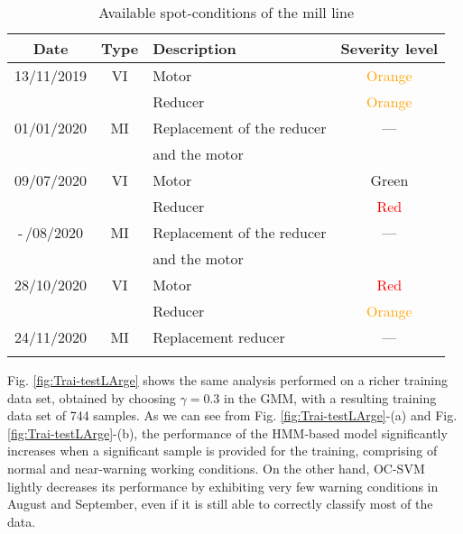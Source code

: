 \begin{table}[h]
	\centering
    \caption{Available spot-conditions of the mill line}
	\begin{tabular}{c c l c}
    \toprule
	Date  & Type & Description & Severity level\\
	\midrule
	\cellcolor[HTML]{EFEFEF}13/11/2019  & \cellcolor[HTML]{EFEFEF}VI &  Motor\cellcolor[HTML]{EFEFEF} & \cellcolor[HTML]{EFEFEF} \textcolor{orange}{Orange}  \\
	\cellcolor[HTML]{EFEFEF}& \cellcolor[HTML]{EFEFEF}& \cellcolor[HTML]{EFEFEF}Reducer & \cellcolor[HTML]{EFEFEF} \textcolor{orange}{Orange}  \\
	01/01/2020  & MI & Replacement of the reducer& ---\\ 
	& & and the motor &\\
	\cellcolor[HTML]{EFEFEF}09/07/2020  &\cellcolor[HTML]{EFEFEF} VI &\cellcolor[HTML]{EFEFEF} Motor &\cellcolor[HTML]{EFEFEF} \textcolor{green!60!black}{Green} \\
	\cellcolor[HTML]{EFEFEF}&\cellcolor[HTML]{EFEFEF} &\cellcolor[HTML]{EFEFEF} Reducer &\cellcolor[HTML]{EFEFEF} \textcolor{red}{Red} \\
	-\,/08/2020 & MI & Replacement of the reducer& ---\\ 
	& & and the motor &\\
	\cellcolor[HTML]{EFEFEF}28/10/2020  &\cellcolor[HTML]{EFEFEF} VI &\cellcolor[HTML]{EFEFEF} Motor &\cellcolor[HTML]{EFEFEF} \textcolor{red}{Red} \\
	\cellcolor[HTML]{EFEFEF}&\cellcolor[HTML]{EFEFEF} &\cellcolor[HTML]{EFEFEF} Reducer &\cellcolor[HTML]{EFEFEF} \textcolor{orange}{Orange} \\
	24/11/2020 & MI & Replacement reducer & ---\\ 
	& &  &\\
	\toprule
\end{tabular}
\label{tab: maintenance}
\end{table}	
Fig. \ref{fig:Trai-testLArge} shows the same analysis performed on a richer training data set, obtained by choosing $\gamma=0.3$ in the GMM, with a resulting training data set of 744 samples. As we can see from Fig. \ref{fig:Trai-testLArge}-(a) and Fig. \ref{fig:Trai-testLArge}-(b), the performance of the HMM-based model significantly increases when a significant sample is provided for the training, comprising of normal and near-warning working conditions. On the other hand, OC-SVM lightly decreases its performance by exhibiting very few warning conditions in August and September, even if it is still able to correctly classify most of the data.
